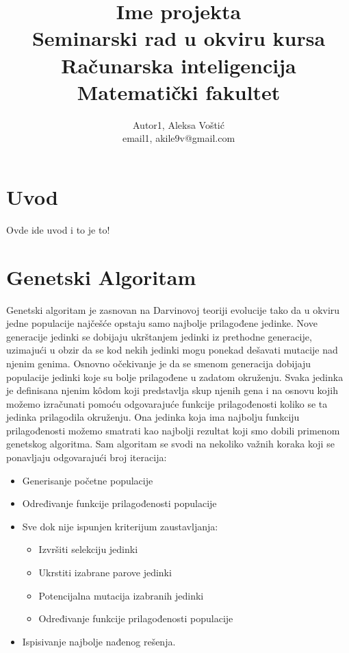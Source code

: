 \documentclass[a4paper]{article}
\begin{document}
\title{Ime projekta\\ \small{Seminarski rad u okviru kursa\\Računarska inteligencija\\ Matematički fakultet}}

\author{Autor1, Aleksa Voštić\\ email1, akile9v@gmail.com}


\maketitle



\tableofcontents

\newpage

\section{Uvod}
\label{sec:uvod}


Ovde ide uvod i to je to!


\section{Genetski Algoritam}
Genetski algoritam je zasnovan na Darvinovoj teoriji evolucije tako da u okviru jedne populacije najčešće opstaju samo najbolje prilagođene jedinke. Nove generacije jedinki se dobijaju ukrštanjem jedinki iz prethodne generacije, uzimajući u obzir da se kod nekih jedinki mogu ponekad dešavati mutacije nad njenim genima. Osnovno očekivanje je da se smenom generacija dobijaju populacije jedinki koje su bolje prilagođene u zadatom okruženju. Svaka jedinka je definisana njenim kôdom koji predstavlja skup njenih gena i na osnovu kojih možemo izračunati pomoću odgovarajuće funkcije prilagođenosti koliko se ta jedinka prilagodila okruženju. Ona jedinka koja ima najbolju funkciju prilagođenosti možemo smatrati kao najbolji rezultat koji smo dobili primenom genetskog algoritma. Sam algoritam se svodi na nekoliko važnih koraka koji se ponavljaju odgovarajući broj iteracija:
\begin{itemize}
  \item Generisanje početne populacije
  \item Određivanje funkcije prilagođenosti populacije
  \item Sve dok nije ispunjen kriterijum zaustavljanja:
  \begin{itemize}
	\item Izvršiti selekciju jedinki
	\item Ukrstiti izabrane parove jedinki
	\item Potencijalna mutacija izabranih jedinki
	\item Određivanje funkcije prilagođenosti populacije
  \end{itemize}
  \item Ispisivanje najbolje nađenog rešenja.
\end{itemize}
\end{document}
